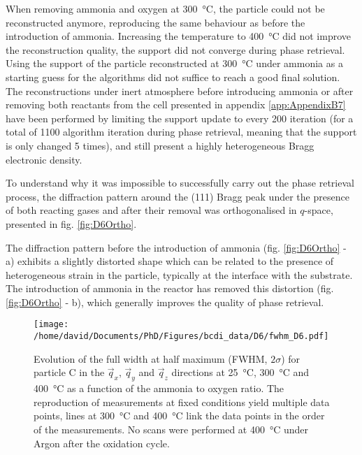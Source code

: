When removing ammonia and oxygen at \qty{300}{\degreeCelsius}, the particle could not be reconstructed anymore, reproducing the same behaviour as before the introduction of ammonia.
Increasing the temperature to \qty{400}{\degreeCelsius} did not improve the reconstruction quality, the support did not converge during phase retrieval.
Using the support of the particle reconstructed at \qty{300}{\degreeCelsius} under ammonia as a starting guess for the algorithms did not suffice to reach a good final solution.
The reconstructions under inert atmosphere before introducing ammonia or after removing both reactants from the cell presented in appendix \ref{app:AppendixB7} have been performed by limiting the support update to every 200 iteration (for a total of 1100 algorithm iteration during phase retrieval, meaning that the support is only changed 5 times), and still present a highly heterogeneous Bragg electronic density.

To understand why it was impossible to successfully carry out the phase retrieval process, the diffraction pattern around the (111) Bragg peak under the presence of both reacting gases and after their removal was orthogonalised in $q$-space, presented in fig. \ref{fig:D6Ortho}.

The diffraction pattern before the introduction of ammonia (fig. \ref{fig:D6Ortho} - a) exhibits a slightly distorted shape which can be related to the presence of heterogeneous strain in the particle, typically at the interface with the substrate.
The introduction of ammonia in the reactor has removed this distortion (fig. \ref{fig:D6Ortho} - b), which generally improves the quality of phase retrieval.

\begin{figure}[!hbt]
    \centering
    \texttt{[image: /home/david/Documents/PhD/Figures/bcdi\_data/D6/fwhm\_D6.pdf]}
    \caption{
        Evolution of the full width at half maximum (FWHM, $2\sigma$) for particle C in the $\vec{q}_x$, $\vec{q}_y$ and $\vec{q}_z$ directions at \qty{25}{\degreeCelsius}, \qty{300}{\degreeCelsius} and \qty{400}{\degreeCelsius} as a function of the ammonia to oxygen ratio.
        The reproduction of measurements at fixed conditions yield multiple data points, lines at \qty{300}{\degreeCelsius} and \qty{400}{\degreeCelsius} link the data points in the order of the measurements.
        No scans were performed at \qty{400}{\degreeCelsius} under Argon after the oxidation cycle.
    }
    \label{fig:D6FWHM}
\end{figure}

